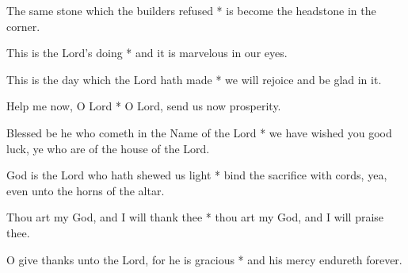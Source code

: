 The same stone which the builders refused * is become the headstone in the corner.

This is the Lord's doing * and it is marvelous in our eyes.

This is the day which the Lord hath made * we will rejoice and be glad in it.

Help me now, O Lord * O Lord, send us now prosperity.

Blessed be he who cometh in the Name of the Lord * we have wished you good luck, ye who are of the house of the Lord.

God is the Lord who hath shewed us light * bind the sacrifice with cords, yea, even unto the horns of the altar.

Thou art my God, and I will thank thee * thou art my God, and I will praise thee.

O give thanks unto the Lord, for he is gracious * and his mercy endureth forever.